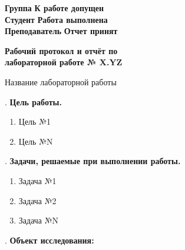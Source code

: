 \documentclass[12pt]{article}
\newcommand{\placeholder}[1]{{\color{magenta}#1}}
\begin{document}
    \vspace*{2\baselineskip}

    \thispagestyle{fancy}

    \noindent
    \textbf{Группа} \underline{\hspace{4.85cm}} \hfill \textbf{К работе допущен} \underline{\hspace{4cm}} \\[0.5cm]
    \textbf{Студент} \underline{\hspace{4.6cm}} \hfill \textbf{Работа выполнена} \underline{\hspace{4cm}} \\[0.5cm]
    \textbf{Преподаватель} \underline{\hspace{3.2cm}} \hfill \textbf{Отчет принят} \underline{\hspace{4.85cm}} \\


    \begin{center}
    {\huge \textbf{Рабочий протокол и отчёт по\\ лабораторной работе № \placeholder{X.YZ}}}

        \smallvspace

        {\Large \placeholder{Название лабораторной работы}}
    \end{center}


    . \textbf{Цель работы.}

    \begin{enumerate}
        \item \placeholder{Цель №1}

        \item \placeholder{Цель №N}
    \end{enumerate}

    \mediumvspace

    . \textbf{Задачи, решаемые при выполнении работы.}

    \begin{enumerate}
        \item \placeholder{Задача №1}

        \item \placeholder{Задача №2}

        \item \placeholder{Задача №N}
    \end{enumerate}

    \mediumvspace

    . \textbf{Объект исследования: } 
    
\end{document}

